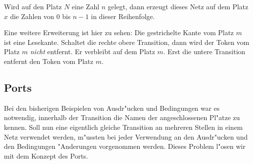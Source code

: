 \documentclass[a4paper,12pt]{article}
\newlength{\st}\setlength{\st}{0pt}
\newcommand{\expression}[1]{\texttt{#1}}
\begin{document}
\begin{center}
\end{center}

Wird auf den Platz $N$ eine Zahl $n$ gelegt, dann erzeugt dieses Netz
auf dem Platz $x$ die Zahlen von 0 bis $n-1$ in dieser Reihenfolge.

Eine weitere Erweiterung ist hier zu sehen: Die gestrichelte Kante vom
Platz $m$ ist eine Lesekante. Schaltet die rechte obere Transition,
dann wird der Token vom Platz $m$ \emph{nicht} entfernt. Er verbleibt
auf dem Platz $m$. Erst die untere Transition entfernt den Token vom
Platz $m$.

\subsection{Ports}

Bei den bisherigen Beispielen von Ausdr"ucken und Bedingungen war es
notwendig, innerhalb der Transition die Namen der angeschlossenen
Pl"atze zu kennen. Soll nun eine eigentlich gleiche Transition an
mehreren Stellen in einem Netz verwendet werden, m"ussten bei jeder
Verwendung an den Ausdr"ucken und den Bedingungen "Anderungen
vorgenommen werden. Dieses Problem l"osen wir mit dem Konzept des
Ports.
\end{document}
